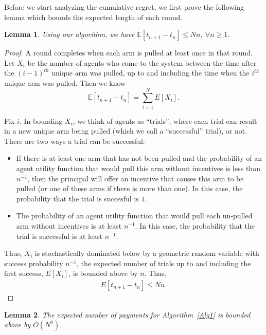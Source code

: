 \documentclass[twoside,11pt]{article}
\newtheorem{lemma}{Lemma}
\begin{document}
Before we start analyzing the cumulative regret, we first prove the following lemma which bounds the expected length of each round.

\begin{lemma}
Using our algorithm, we have $\mathbb{E}[t_{n+1}-t_{n}]\leq Nn$, $\forall n\geq 1$.
\label{round:length}
\end{lemma}


\begin{proof}
	A round completes when each arm is pulled at least once in that round. Let $X_{i}$ be the number of agents who come to the system between the time after the $(i-1)^{th}$ unique arm was pulled, up to and including the time when the $i^{th}$ unique arm was pulled. Then we know 
\begin{equation*}
\mathbb{E}[t_{n+1}-t_{n}]=\sum_{i=1}^{N}E[X_{i}].
\end{equation*}


Fix $i$. In bounding $X_i$, we think of agents as ``trials'', where each trial can result in a new unique arm being pulled (which we call a ``successful'' trial), or not.  There are two ways a trial can be successful:
\begin{itemize}
\item If there is at least one arm that has not been pulled and the probability of an agent utility function that would pull this arm without incentives is less than $n^{-1}$, then the principal will offer an incentive that causes this arm to be pulled (or one of these arms if there is more than one). In this case, the probability that the trial is succesful is $1$.  
\item The probability of an agent utility function that would pull each un-pulled arm without incentives is at least $n^{-1}$. In this case, the probability that the trial is successful is at least $n^{-1}$.
\end{itemize}

Thus, $X_{i}$ is stochastically dominated below by a geometric random variable with success probability $n^{-1}$, the expected number of trials up to and including the first success, $E[X_i]$, is bounded above by $n$.  Thus,
\begin{align}
E[t_{n+1}-t_{n}]\leq Nn. \nonumber
\end{align}
\end{proof}


\begin{lemma}
The expected number of payments for Algorithm~\ref{Alg1} is bounded above by $O(N^2)$.
\label{lemma:numP}
\end{lemma}
\end{document}
